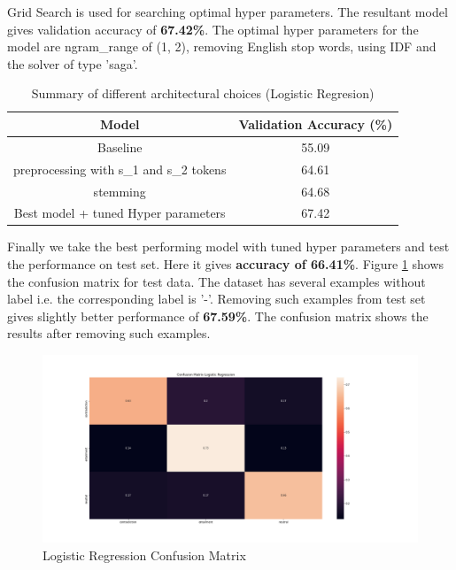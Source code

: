 \documentclass[10pt,a4paper]{article}
\begin{document}
Grid Search is used for searching optimal hyper parameters. The resultant model gives validation accuracy of \textbf{67.42\%}. The optimal hyper parameters for the model are ngram\_range of (1, 2), removing English stop words, using IDF and the solver of type 'saga'.

\begin{table}[h!]
\centering
\begin{tabular}{|c| c|} 
 \hline
 Model & Validation Accuracy (\%) \\
 \hline\hline
 Baseline & 55.09 \\ 
 \hline
 preprocessing with s\_1 and s\_2 tokens & 64.61 \\ 
 \hline
 stemming & 64.68 \\ 
 \hline
 Best model + tuned Hyper parameters & 67.42 \\ 
 \hline
\end{tabular}
\caption{Summary of different architectural choices (Logistic Regresion)}
\label{table:2}
\end{table}

Finally we take the best performing model with tuned hyper parameters and test the performance on test set. Here it gives \textbf{accuracy of 66.41\%}. Figure \ref{mlpcm} shows the confusion matrix for test data. The dataset has several examples without label i.e. the corresponding label is '-'. Removing such examples from test set gives slightly better performance of \textbf{67.59\%}. The confusion matrix shows the results after removing such examples. \\

\begin{figure}[h!]
	\includegraphics[width=1.3\linewidth]{../img/cm_lr.png}
	\caption{Logistic Regression Confusion Matrix}
	\label{mlpcm}
\end{figure}
\end{document}
